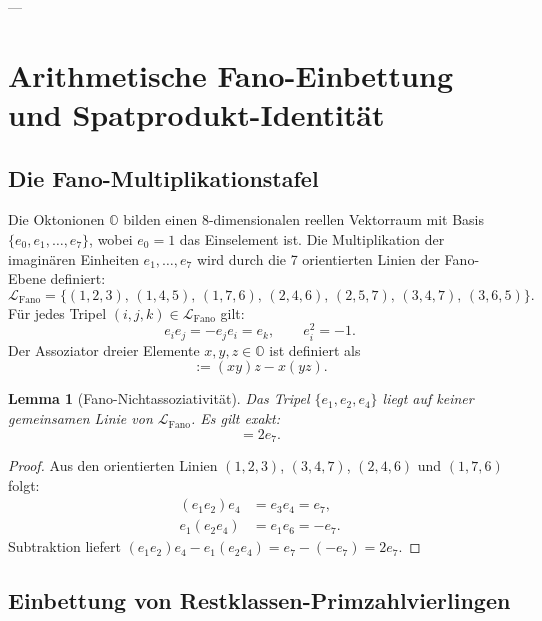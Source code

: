 \documentclass[11pt,a4paper]{article}
\theoremstyle{plain}
\newtheorem{lemma}[theorem]{Lemma}
\theoremstyle{definition}
\theoremstyle{remark}
\begin{document}
---

\section{Arithmetische Fano-Einbettung und Spatprodukt-Identität}

\subsection{Die Fano-Multiplikationstafel}

Die Oktonionen $\mathbb{O}$ bilden einen 8-dimensionalen reellen Vektorraum mit Basis $\{e_0, e_1, \dots, e_7\}$, wobei $e_0 = 1$ das Einselement ist. Die Multiplikation der imaginären Einheiten $e_1, \dots, e_7$ wird durch die 7 orientierten Linien der Fano-Ebene definiert:
\begin{equation}
\mathcal{L}_{\mathrm{Fano}} = \bigl\{ (1,2,3), \, (1,4,5), \, (1,7,6), \, (2,4,6), \, (2,5,7), \, (3,4,7), \, (3,6,5) \bigr\}.
\end{equation}
Für jedes Tripel $(i, j, k) \in \mathcal{L}_{\mathrm{Fano}}$ gilt:
\begin{equation}
e_i e_j = -e_j e_i = e_k, \qquad e_i^2 = -1.
\end{equation}
Der Assoziator dreier Elemente $x, y, z \in \mathbb{O}$ ist definiert als
\begin{equation}
[x, y, z] := (xy)z - x(yz).
\end{equation}

\begin{lemma}[Fano-Nichtassoziativität]
Das Tripel $\{e_1, e_2, e_4\}$ liegt auf keiner gemeinsamen Linie von $\mathcal{L}_{\mathrm{Fano}}$. Es gilt exakt:
\begin{equation}
[e_1, e_2, e_4] = 2e_7.
\end{equation}
\end{lemma}
\begin{proof}
Aus den orientierten Linien $(1,2,3)$, $(3,4,7)$, $(2,4,6)$ und $(1,7,6)$ folgt:
\begin{align*}
(e_1 e_2) e_4 &= e_3 e_4 = e_7, \\
e_1 (e_2 e_4) &= e_1 e_6 = -e_7.
\end{align*}
Subtraktion liefert $(e_1 e_2) e_4 - e_1 (e_2 e_4) = e_7 - (-e_7) = 2e_7$.
\end{proof}

\subsection{Einbettung von Restklassen-Primzahlvierlingen}
\end{document}
